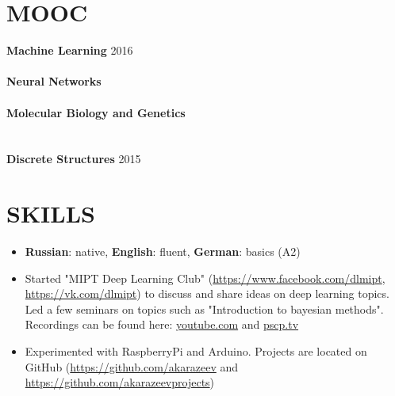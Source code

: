 \documentclass[margin, 9pt]{res} %
\newcommand\tab[1][1cm]{\hspace*{#1}}
\begin{document}
\begin{resume}

\section{MOOC}

\textbf{Machine Learning} \hfill 2016 \\
\tab {\sl by Yandex \& MIPT on coursera.org} \\
\textbf{Neural Networks} \\
\tab {\sl by Bioinformatics Institute on stepik.org} \\
\textbf{Molecular Biology and Genetics} \\
\tab {\sl by Bioinformatics Institute on stepik.org} \\
\\
\textbf{Discrete Structures} \hfill 2015 \\
\tab {\sl by Alex Dainiak (MIPT) on stepik.org}




\section{SKILLS} 

\begin{itemize} 
\item \textbf{Russian}: native, \textbf{English}: fluent, \textbf{German}: basics (A2)
\item Started "MIPT Deep Learning Club" (\href{https://www.facebook.com/dlmipt}{https://www.facebook.com/dlmipt}, \\ \href{https://vk.com/dlmipt}{https://vk.com/dlmipt}) to discuss and share ideas on deep learning topics. Led a few seminars on topics such as "Introduction to bayesian methods". Recordings can be found here: \href{https://www.youtube.com/playlist?list=PLsGmQ_AGA4yxVRTFrpnpsXrYSLADxGmTO}{youtube.com} and \href{https://www.pscp.tv/akarazeev}{pscp.tv}
\item Experimented with RaspberryPi and Arduino. Projects are located on GitHub (\href{https://github.com/akarazeev}{https://github.com/akarazeev} and \href{https://github.com/akarazeevprojects}{https://github.com/akarazeevprojects})
\end{itemize}

\end{resume}
\end{document}
